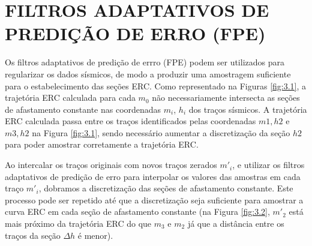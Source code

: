 %
% 
% 
% 
% 
% 
% 

\chapter{FILTROS ADAPTATIVOS DE PREDIÇÃO DE ERRO (FPE)}



Os filtros adaptativos de predição de errro (FPE) podem ser utilizados para regularizar os dados sísmicos,
de modo a produzir uma amostragem suficiente para o estabelecimento das seções ERC.
Como representado na Figuras \ref{fig:3.1}, a trajetória ERC calculada para cada $m_0$ não
necessariamente intersecta as seções de afastamento constante nas coordenadas $m_i$, $h_i$ dos traços sísmicos. 
A trajetória ERC calculada passa entre os traços identificados pelas coordenadas $m1,h2$ e $m3, h2$ na Figura \ref{fig:3.1},
sendo necessário aumentar a discretização da seção $h2$ para poder amostrar corretamente a trajetória ERC.

Ao intercalar os traços originais com novos traços zerados $m'_i$, e utilizar os filtros adaptativos de predição
de erro para interpolar os valores das amostras em cada traço $m'_i$, dobramos 
a discretização das seções de afastamento constante.
Este processo pode ser repetido até que a discretização seja suficiente para amostrar a curva ERC em cada seção de afastamento
constante (na Figura \ref{fig:3.2}, $m'_2$ está mais próximo da trajetória 
ERC do que $m_3$ e $m_2$ já que a distância 
entre os traços da seção $\Delta h$ é menor).

